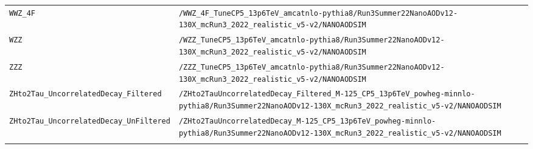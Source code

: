 \begin{longtable}{@{}>{\RaggedRight\arraybackslash}p{} >{\RaggedRight\arraybackslash}p{}@{}}
\addlinespace[2pt]
\texttt{WWZ\_\allowbreak{}4F} & \texttt{/\allowbreak{}WWZ\_\allowbreak{}4F\_\allowbreak{}TuneCP5\_\allowbreak{}13p6TeV\_\allowbreak{}amcatnlo-\allowbreak{}pythia8/\allowbreak{}Run3Summer22NanoAODv12-\allowbreak{}130X\_\allowbreak{}mcRun3\_\allowbreak{}2022\_\allowbreak{}realistic\_\allowbreak{}v5-\allowbreak{}v2/\allowbreak{}NANOAODSIM} \\
\addlinespace[2pt]
\texttt{WZZ} & \texttt{/\allowbreak{}WZZ\_\allowbreak{}TuneCP5\_\allowbreak{}13p6TeV\_\allowbreak{}amcatnlo-\allowbreak{}pythia8/\allowbreak{}Run3Summer22NanoAODv12-\allowbreak{}130X\_\allowbreak{}mcRun3\_\allowbreak{}2022\_\allowbreak{}realistic\_\allowbreak{}v5-\allowbreak{}v2/\allowbreak{}NANOAODSIM} \\
\addlinespace[2pt]
\texttt{ZZZ} & \texttt{/\allowbreak{}ZZZ\_\allowbreak{}TuneCP5\_\allowbreak{}13p6TeV\_\allowbreak{}amcatnlo-\allowbreak{}pythia8/\allowbreak{}Run3Summer22NanoAODv12-\allowbreak{}130X\_\allowbreak{}mcRun3\_\allowbreak{}2022\_\allowbreak{}realistic\_\allowbreak{}v5-\allowbreak{}v2/\allowbreak{}NANOAODSIM} \\
\addlinespace[2pt]
\texttt{ZHto2Tau\_\allowbreak{}UncorrelatedDecay\_\allowbreak{}Filtered} & \texttt{/\allowbreak{}ZHto2TauUncorrelatedDecay\_\allowbreak{}Filtered\_\allowbreak{}M-\allowbreak{}125\_\allowbreak{}CP5\_\allowbreak{}13p6TeV\_\allowbreak{}powheg-\allowbreak{}minnlo-\allowbreak{}pythia8/\allowbreak{}Run3Summer22NanoAODv12-\allowbreak{}130X\_\allowbreak{}mcRun3\_\allowbreak{}2022\_\allowbreak{}realistic\_\allowbreak{}v5-\allowbreak{}v2/\allowbreak{}NANOAODSIM} \\
\addlinespace[2pt]
\texttt{ZHto2Tau\_\allowbreak{}UncorrelatedDecay\_\allowbreak{}UnFiltered} & \texttt{/\allowbreak{}ZHto2TauUncorrelatedDecay\_\allowbreak{}M-\allowbreak{}125\_\allowbreak{}CP5\_\allowbreak{}13p6TeV\_\allowbreak{}powheg-\allowbreak{}minnlo-\allowbreak{}pythia8/\allowbreak{}Run3Summer22NanoAODv12-\allowbreak{}130X\_\allowbreak{}mcRun3\_\allowbreak{}2022\_\allowbreak{}realistic\_\allowbreak{}v5-\allowbreak{}v2/\allowbreak{}NANOAODSIM} \\
\addlinespace[2pt]
\end{longtable}
